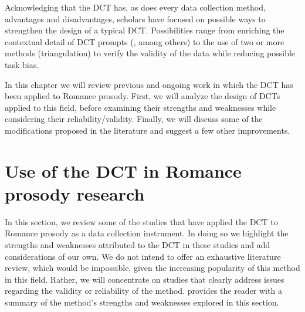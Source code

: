 \documentclass[output=paper]{LSP/langsci}
\begin{document}
Acknowledging that the DCT has, as does every data collection method, advantages and disadvantages, scholars have focused on possible ways to strengthen the design of a typical DCT. Possibilities range from enriching the contextual detail of DCT prompts (\citealt{Billmyer2000,Rose2000,Cohen2003,Schauer2004,McLean2005}, among others) to the use of two or more methods (triangulation) \citep{Wiersma1986} to verify the validity of the data while reducing possible task bias.

In this chapter we will review previous and ongoing work in which the DCT has been applied to Romance prosody. First, we will analyze the design of DCTs applied to this field, before examining their strengths and weaknesses while considering their reliability/validity. Finally, we will discuss some of the modifications proposed in the literature and suggest a few other improvements.  

\section{Use of the DCT in Romance prosody research}
\label{sec:van:2}
In this section, we review some of the studies that have applied the DCT to Romance prosody as a data collection instrument. In doing so we highlight the strengths and weaknesses attributed to the DCT in these studies and add considerations of our own. We do not intend to offer an exhaustive literature review, which would be impossible, given the increasing popularity of this method in this field. Rather, we will concentrate on studies that clearly address issues regarding the validity or reliability of the method.  provides the reader with a summary of the method’s strengths and weaknesses explored in this section.
\end{document}
